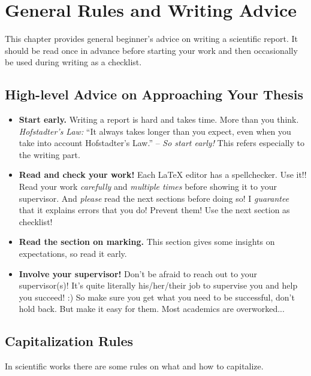 \chapter{General Rules and Writing Advice}\label{chap:abstractAdvice}

This chapter provides general beginner's advice on writing a scientific report. It should be read once in advance before starting your work and then occasionally be used during writing as a checklist.

\section{High-level Advice on Approaching Your Thesis}\label{chap:content}

\begin{itemize}
 \item \textbf{Start early.} 
 Writing a report is hard and takes time. More than you think. \emph{Hofstadter's Law:} ``It always takes longer than you expect, even when you take into account Hofstadter's Law.'' -- \emph{So start early!} This refers especially to the writing part.
 \item \textbf{Read and check your work!} Each \LaTeX{} editor has a spellchecker. Use it!! Read your work \emph{carefully} and \emph{multiple times} before showing it to your supervisor. And \emph{please} read the next sections before doing so! I \emph{guarantee} that it explains errors that you do! Prevent them! Use the next section as checklist!
 \item \textbf{Read the section on marking.} This section gives some insights on expectations, so read it early. 
 \item \textbf{Involve your supervisor!} Don't be afraid to reach out to your supervisor(s)! It's quite literally his/her/their job to supervise you and help you succeed! :) So make sure you get what you need to be successful, don't hold back. But make it easy for them. Most academics are overworked...
\end{itemize}



\section{Capitalization Rules}\label{sec:capitalization}

In scientific works there are some rules on what and how to capitalize.

